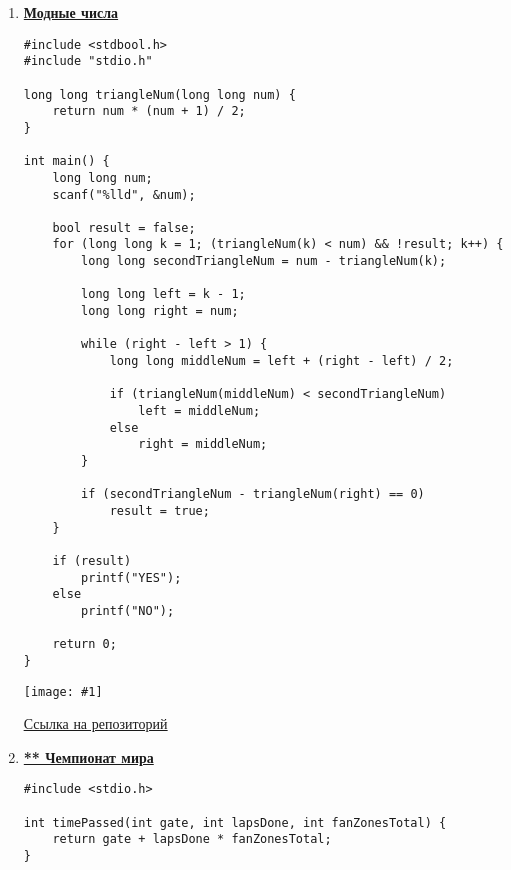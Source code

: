 \documentclass[a4paper,14pt]{extarticle}
\newcommand\codeforcesresult[1]{
    \begin{center}
        \texttt{[image: \#1]}
    \end{center}
}
\begin{document}
\begin{enumerate}
\begin{verbatim}
    right += xVelocity < yVelocity ? xVelocity : yVelocity;

    printf("%d", right);

    return 0;
}
\end{verbatim}
\codeforcesresult{/codeforceresults/283932A}
\href{https://github.com/IAmProgrammist/programming-and-algorithmization-basics/blob/c/lab10/6.c}{\underline{Ссылка на репозиторий}}

\newpage
\item \href{https://codeforces.com/problemset/problem/192/A}{\textbf{Модные числа}}
\begin{verbatim}
#include <stdbool.h>
#include "stdio.h"

long long triangleNum(long long num) {
    return num * (num + 1) / 2;
}

int main() {
    long long num;
    scanf("%lld", &num);

    bool result = false;
    for (long long k = 1; (triangleNum(k) < num) && !result; k++) {
        long long secondTriangleNum = num - triangleNum(k);

        long long left = k - 1;
        long long right = num;

        while (right - left > 1) {
            long long middleNum = left + (right - left) / 2;

            if (triangleNum(middleNum) < secondTriangleNum)
                left = middleNum;
            else
                right = middleNum;
        }

        if (secondTriangleNum - triangleNum(right) == 0)
            result = true;
    }

    if (result)
        printf("YES");
    else
        printf("NO");

    return 0;
}
\end{verbatim}
\codeforcesresult{/codeforceresults/192A}
\href{https://github.com/IAmProgrammist/programming-and-algorithmization-basics/blob/c/lab10/12.c}{\underline{Ссылка на репозиторий}}

\newpage
\item \href{https://codeforces.com/contest/996/problem/B}{\textbf{** Чемпионат мира}}
\begin{verbatim}
#include <stdio.h>

int timePassed(int gate, int lapsDone, int fanZonesTotal) {
    return gate + lapsDone * fanZonesTotal;
}


\end{verbatim}
\end{enumerate}
\end{document}

